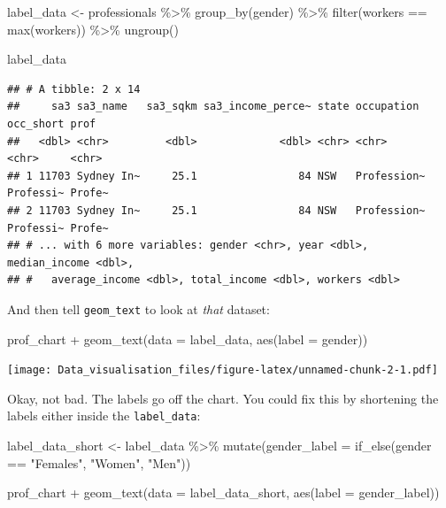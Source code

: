 \documentclass[
]{book}
\newenvironment{Shaded}{\begin{snugshade}}{\end{snugshade}}
\newcommand{\AttributeTok}[1]{\textcolor[rgb]{0.77,0.63,0.00}{#1}}
\newcommand{\FunctionTok}[1]{\textcolor[rgb]{0.00,0.00,0.00}{#1}}
\newcommand{\NormalTok}[1]{#1}
\newcommand{\OtherTok}[1]{\textcolor[rgb]{0.56,0.35,0.01}{#1}}
\newcommand{\SpecialCharTok}[1]{\textcolor[rgb]{0.00,0.00,0.00}{#1}}
\newcommand{\StringTok}[1]{\textcolor[rgb]{0.31,0.60,0.02}{#1}}
\begin{document}
\begin{Shaded}
\begin{Highlighting}[]
\NormalTok{label\_data }\OtherTok{\textless{}{-}}\NormalTok{ professionals }\SpecialCharTok{\%\textgreater{}\%} 
  \FunctionTok{group\_by}\NormalTok{(gender) }\SpecialCharTok{\%\textgreater{}\%} 
  \FunctionTok{filter}\NormalTok{(workers }\SpecialCharTok{==} \FunctionTok{max}\NormalTok{(workers)) }\SpecialCharTok{\%\textgreater{}\%} 
  \FunctionTok{ungroup}\NormalTok{()}

\NormalTok{label\_data}
\end{Highlighting}
\end{Shaded}

\begin{verbatim}
## # A tibble: 2 x 14
##     sa3 sa3_name   sa3_sqkm sa3_income_perce~ state occupation  occ_short prof  
##   <dbl> <chr>         <dbl>             <dbl> <chr> <chr>       <chr>     <chr> 
## 1 11703 Sydney In~     25.1                84 NSW   Profession~ Professi~ Profe~
## 2 11703 Sydney In~     25.1                84 NSW   Profession~ Professi~ Profe~
## # ... with 6 more variables: gender <chr>, year <dbl>, median_income <dbl>,
## #   average_income <dbl>, total_income <dbl>, workers <dbl>
\end{verbatim}

And then tell \texttt{geom\_text} to look at \emph{that} dataset:

\begin{Shaded}
\begin{Highlighting}[]
\NormalTok{prof\_chart }\SpecialCharTok{+}
  \FunctionTok{geom\_text}\NormalTok{(}\AttributeTok{data =}\NormalTok{ label\_data,}
            \FunctionTok{aes}\NormalTok{(}\AttributeTok{label =}\NormalTok{ gender))}
\end{Highlighting}
\end{Shaded}

\texttt{[image: Data\_visualisation\_files/figure-latex/unnamed-chunk-2-1.pdf]}

Okay, not bad. The labels go off the chart. You could fix this by shortening the labels either inside the \texttt{label\_data}:

\begin{Shaded}
\begin{Highlighting}[]
\NormalTok{label\_data\_short }\OtherTok{\textless{}{-}}\NormalTok{ label\_data }\SpecialCharTok{\%\textgreater{}\%} 
  \FunctionTok{mutate}\NormalTok{(}\AttributeTok{gender\_label =} \FunctionTok{if\_else}\NormalTok{(gender }\SpecialCharTok{==} \StringTok{"Females"}\NormalTok{, }
                             \StringTok{"Women"}\NormalTok{, }
                             \StringTok{"Men"}\NormalTok{))}

\NormalTok{prof\_chart }\SpecialCharTok{+}
  \FunctionTok{geom\_text}\NormalTok{(}\AttributeTok{data =}\NormalTok{ label\_data\_short,}
            \FunctionTok{aes}\NormalTok{(}\AttributeTok{label =}\NormalTok{ gender\_label))}
\end{Highlighting}
\end{Shaded}
\end{document}
